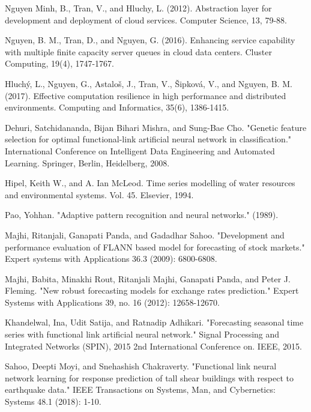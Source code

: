 \documentclass[conference]{IEEEtran}
\begin{document}
\begin{thebibliography}{00}

Nguyen Minh, B., Tran, V., and Hluchy, L. (2012). Abstraction layer for development and deployment of cloud services. Computer Science, 13, 79-88.

Nguyen, B. M., Tran, D., and Nguyen, G. (2016). Enhancing service capability with multiple finite capacity server queues in cloud data centers. Cluster Computing, 19(4), 1747-1767.

Hluchý, L., Nguyen, G., Astaloš, J., Tran, V., Šipková, V., and Nguyen, B. M. (2017). Effective computation resilience in high performance and distributed environments. Computing and Informatics, 35(6), 1386-1415.

Dehuri, Satchidananda, Bijan Bihari Mishra, and Sung-Bae Cho. "Genetic feature selection for optimal functional-link artificial neural network in classification." International Conference on Intelligent Data Engineering and Automated Learning. Springer, Berlin, Heidelberg, 2008.

Hipel, Keith W., and A. Ian McLeod. Time series modelling of water resources and environmental systems. Vol. 45. Elsevier, 1994.

Pao, Yohhan. "Adaptive pattern recognition and neural networks." (1989).

Majhi, Ritanjali, Ganapati Panda, and Gadadhar Sahoo. "Development and performance evaluation of FLANN based model for forecasting of stock markets." Expert systems with Applications 36.3 (2009): 6800-6808.

Majhi, Babita, Minakhi Rout, Ritanjali Majhi, Ganapati Panda, and Peter J. Fleming. "New robust forecasting models for exchange rates prediction." Expert Systems with Applications 39, no. 16 (2012): 12658-12670.

Khandelwal, Ina, Udit Satija, and Ratnadip Adhikari. "Forecasting seasonal time series with functional link artificial neural network." Signal Processing and Integrated Networks (SPIN), 2015 2nd International Conference on. IEEE, 2015.

Sahoo, Deepti Moyi, and Snehashish Chakraverty. "Functional link neural network learning for response prediction of tall shear buildings with respect to earthquake data." IEEE Transactions on Systems, Man, and Cybernetics: Systems 48.1 (2018): 1-10.


\end{thebibliography}
\end{document}
